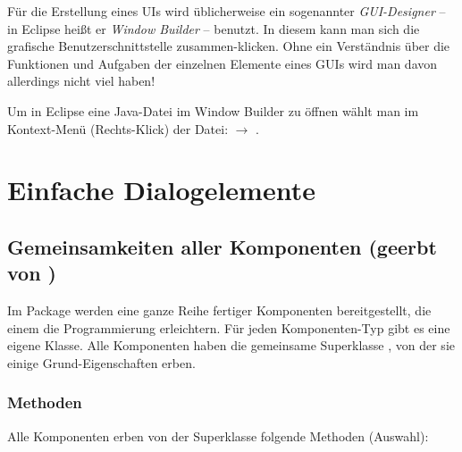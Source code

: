 Für die Erstellung eines UIs wird üblicherweise ein sogenannter
\emph{GUI-Designer} --  in Eclipse heißt er \emph{Window Builder} -- benutzt.
In diesem kann man sich die grafische Benutzerschnittstelle \glqq
zusammen-klicken\grqq . Ohne ein Verständnis über die Funktionen und Aufgaben
der einzelnen Elemente eines GUIs wird man davon allerdings nicht viel haben!

Um in Eclipse eine Java-Datei im Window Builder zu öffnen wählt man im
Kontext-Menü (Rechts-Klick) der Datei:  $\rightarrow$
.

\clearpage

\section{Einfache Dialogelemente}

\subsection{Gemeinsamkeiten aller Komponenten (geerbt von
)}

Im Package  werden eine ganze Reihe fertiger Komponenten
bereitgestellt, die einem die Programmierung erleichtern. Für jeden
Komponenten-Typ gibt es eine eigene Klasse. Alle Komponenten haben die
gemeinsame Superklasse , von der sie einige
Grund-Eigenschaften erben.

\subsubsection{Methoden}

Alle Komponenten erben von der Superklasse  folgende
Methoden (Auswahl):

